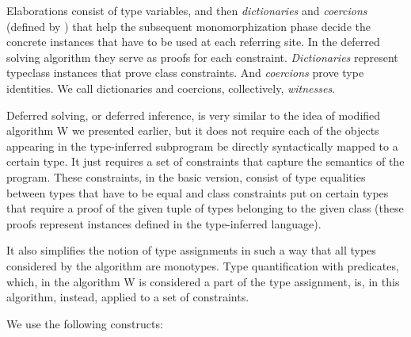 Elaborations consist of type variables, and then \emph{dictionaries} and \emph{coercions} (defined by \citet{vytiniotis2011outsidein}) that help the subsequent monomorphization phase decide the concrete instances that have to be used at each referring site. In the deferred solving algorithm they serve as proofs for each constraint. \emph{Dictionaries} represent typeclass instances that prove class constraints. And \emph{coercions} prove type identities. We call dictionaries and coercions, collectively, \emph{witnesses}.

Deferred solving, or deferred inference, is very similar to the idea of modified algorithm W we presented earlier, but it does not require each of the objects appearing in the type-inferred subprogram be directly syntactically mapped to a certain type. It just requires a set of constraints that capture the semantics of the program. These constraints, in the basic version, consist of type equalities between types that have to be equal and class constraints put on certain types that require a proof of the given tuple of types belonging to the given class (these proofs represent instances defined in the type-inferred language).

It also simplifies the notion of type assignments in such a way that all types considered by the algorithm are monotypes. Type quantification with predicates, which, in the algorithm W is considered a part of the type assignment, is, in this algorithm, instead, applied to a set of constraints.

We use the following constructs:


